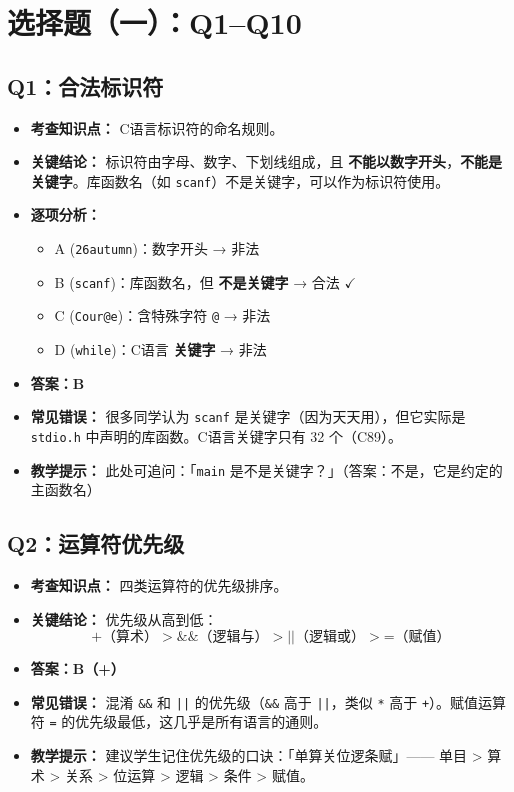 \section{选择题（一）：Q1--Q10}

\subsection{Q1：合法标识符}

\begin{itemize}
    \item \textbf{考查知识点：} C语言标识符的命名规则。
    \item \textbf{关键结论：} 标识符由字母、数字、下划线组成，且 \textbf{不能以数字开头}，\textbf{不能是关键字}。库函数名（如 \texttt{scanf}）不是关键字，可以作为标识符使用。
    \item \textbf{逐项分析：}
    \begin{itemize}
        \item A (\texttt{26autumn})：数字开头 → 非法
        \item B (\texttt{scanf})：库函数名，但 \textbf{不是关键字} → 合法 $\checkmark$
        \item C (\texttt{Cour@e})：含特殊字符 \texttt{@} → 非法
        \item D (\texttt{while})：C语言 \textbf{关键字} → 非法
    \end{itemize}
    \item {\color{highlight}\textbf{答案：B}}
    \item \textbf{常见错误：} 很多同学认为 \texttt{scanf} 是关键字（因为天天用），但它实际是 \texttt{stdio.h} 中声明的库函数。C语言关键字只有 32 个（C89）。
    \item \textbf{教学提示：} 此处可追问：「\texttt{main} 是不是关键字？」（答案：不是，它是约定的主函数名）
\end{itemize}

\subsection{Q2：运算符优先级}

\begin{itemize}
    \item \textbf{考查知识点：} 四类运算符的优先级排序。
    \item \textbf{关键结论：} 优先级从高到低：
    \[
    \texttt{+（算术）} > \texttt{\&\&（逻辑与）} > \texttt{||（逻辑或）} > \texttt{=（赋值）}
    \]
    \item {\color{highlight}\textbf{答案：B（+）}}
    \item \textbf{常见错误：} 混淆 \texttt{\&\&} 和 \texttt{||} 的优先级（\texttt{\&\&} 高于 \texttt{||}，类似 \texttt{*} 高于 \texttt{+}）。赋值运算符 \texttt{=} 的优先级最低，这几乎是所有语言的通则。
    \item \textbf{教学提示：} 建议学生记住优先级的口诀：「单算关位逻条赋」—— 单目 > 算术 > 关系 > 位运算 > 逻辑 > 条件 > 赋值。
\end{itemize}

